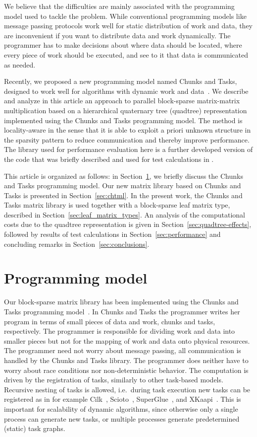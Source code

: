 \documentclass{elsarticle}
\begin{document}
We believe that the difficulties are mainly associated with the
programming model used to tackle the problem.  While conventional
programming models like message passing protocols work well for static
distribution of work and data, they are inconvenient if you want to
distribute data and work dynamically.  The programmer has to make
decisions about where data should be located, where every piece of
work should be executed, and see to it that data is communicated as
needed.

Recently, we proposed a new programming model named Chunks and Tasks,
designed to work well for algorithms with dynamic work and
data~\cite{chunks-and-tasks}.
We describe and analyze in this article an approach to parallel
block-sparse matrix-matrix multiplication based on a hierarchical
quaternary tree (quadtree) representation implemented using the Chunks
and Tasks programming model. The method is locality-aware in the sense
that it is able to exploit a priori unknown structure in the sparsity
pattern to reduce communication and thereby improve performance. The
library used for performance evaluation here is a further developed
version of the code that was briefly described and used for test
calculations in \cite{chunks-and-tasks}.

This article is organized as follows: in Section~\ref{sec:model}, we
briefly discuss the Chunks and Tasks programming model. Our new matrix
library based on Chunks and Tasks is presented in
Section~\ref{sec:chtml}.  In the present work, the Chunks and Tasks
matrix library is used together with a block-sparse leaf matrix type,
described in Section~\ref{sec:leaf_matrix_types}.
An analysis of the computational costs due to the quadtree
representation is given in Section~\ref{sec:quadtree-effects},
followed by results of test calculations in
Section~\ref{sec:performance} and concluding remarks in
Section~\ref{sec:conclusions}.


\section{Programming model}\label{sec:model}
Our block-sparse matrix library has been implemented using the Chunks
and Tasks programming model~\cite{chunks-and-tasks}. In Chunks and
Tasks the programmer writes her program in terms
of small pieces of data and work, chunks and tasks, respectively. The
programmer is responsible for dividing work and data into smaller
pieces but not for the mapping of work and data onto physical
resources. The programmer need not worry about message passing, all
communication is handled by the Chunks and Tasks library. The
programmer does neither have to worry about race conditions nor
non-deterministic behavior.
The computation is driven by the registration of tasks,
similarly to other task-based models. Recursive nesting of tasks is
allowed, i.e.~during task execution new tasks can be registered as in
for example Cilk~\cite{cilk}, Scioto~\cite{scioto},
SuperGlue~\cite{superglue}, and XKaapi~\cite{xkaapi}. This is
important for scalability of dynamic algorithms, since otherwise only
a single process can generate new tasks, or multiple processes
generate predetermined (static) task graphs.
\end{document}
